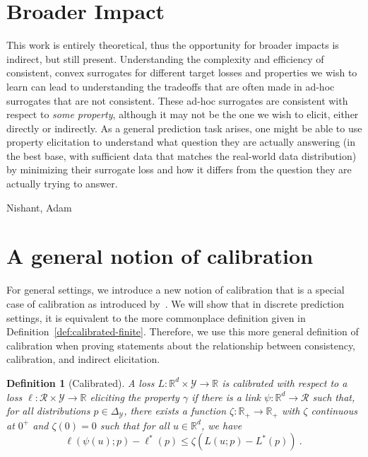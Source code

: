 \documentclass{article}
\newcommand{\reals}{\mathbb{R}}
\newcommand{\simplex}{\Delta_\Y}
\newcommand{\R}{\mathcal{R}}
\newcommand{\Y}{\mathcal{Y}}
\newcommand{\risk}[1]{#1^*}
\newtheorem{definition}{Definition}
\begin{document}
\newpage

\section*{Broader Impact}
This work is entirely theoretical, thus the opportunity for broader impacts is indirect, but still present.
Understanding the complexity and efficiency of consistent, convex surrogates for different target losses and properties we wish to learn can lead to understanding the tradeoffs that are often made in ad-hoc surrogates that are not consistent.
These ad-hoc surrogates are consistent with respect to \emph{some property}, although it may not be the one we wish to elicit, either directly or indirectly.
As a general prediction task arises, one might be able to use property elicitation to understand what question they are actually answering (in the best base, with sufficient data that matches the real-world data distribution) by minimizing their surrogate loss and how it differs from the question they are actually trying to answer.

\begin{ack}
Nishant, Adam
\end{ack}




\newpage
\appendix
\section{A general notion of calibration}\label{app:calibration}
For general settings, we introduce a new notion of calibration that is a special case of calibration as introduced by~\cite[Chapter 3]{steinwart2008support}.
We will show that in discrete prediction settings, it is equivalent to the more commonplace definition given in Definition~\ref{def:calibrated-finite}.
Therefore, we use this more general definition of calibration when proving statements about the relationship between consistency, calibration, and indirect elicitation.

\begin{definition}[Calibrated]\label{def:calibrated-general}
	A loss $L:\reals^d \times \Y \to \reals$ is \emph{calibrated} with respect to a loss $\ell : \R \times \Y \to \reals$ eliciting the property $\gamma$ if there is a link $\psi : \reals^d \to \R$ such that, for all distributions $p \in \simplex$, there exists a function $\zeta : \reals_+ \to \reals_+$ with $\zeta$ continuous at $0^+$ and $\zeta(0) = 0$ such that for all $u \in \reals^d$, we have
	\begin{equation}\label{eq:calibrated-general}
	\ell( \psi(u); p) - \risk{\ell}(p)  \leq \zeta \left(  L(u;p) - \risk{L}(p) \right)~.~
	\end{equation}
\end{definition}
\end{document}
